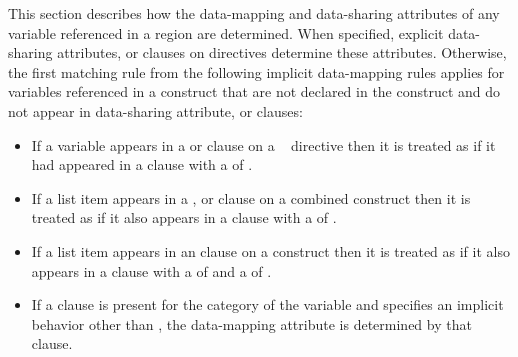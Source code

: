 This section describes how the data-mapping and data-sharing attributes of
any variable referenced in a  region are determined. When specified,
explicit data-sharing attributes,  or  clauses on
 directives determine these attributes.  Otherwise, the first matching rule
from the following implicit data-mapping rules applies for variables referenced
in a  construct that are not declared in the construct and do not appear in
data-sharing attribute,  or  clauses:

\begin{itemize}
\item If a variable appears in a  or  clause on a
  ~ directive then it is treated as if it had
  appeared in a  clause with a  of .

\item If a list item appears in a ,  or
     clause on a combined  construct then it is treated as
    if it also appears in a  clause with a  of
    .

\item If a list item appears in an  clause on a
     construct then it is treated as if it also appears in a
     clause with a  of  and a
     of .

\item If a  clause is present for the category of the
    variable and specifies an implicit behavior other than ,
    the data-mapping attribute is determined by that clause.

\end{itemize}
